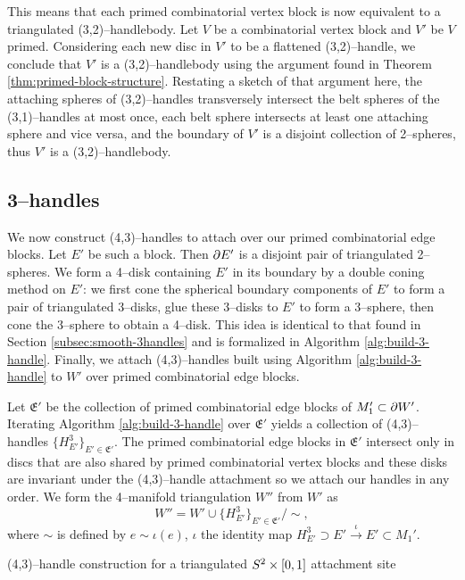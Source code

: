 This means that each primed combinatorial vertex block is now equivalent to a triangulated (3,2)--handlebody.
Let $V$ be a combinatorial vertex block and $V'$ be $V$ primed.
Considering each new disc in $V'$ to be a flattened (3,2)--handle, we conclude that $V'$ is a (3,2)--handlebody using the argument found in Theorem \ref{thm:primed-block-structure}.
Restating a sketch of that argument here, the attaching spheres of (3,2)--handles transversely intersect the belt spheres of the (3,1)--handles at most once, each belt sphere intersects at least one attaching sphere and vice versa, and the boundary of $V'$ is a disjoint collection of 2--spheres, thus $V'$ is a (3,2)--handlebody.

\subsection{3--handles}

We now construct (4,3)--handles to attach over our primed combinatorial edge blocks.
Let $E'$ be such a block.
Then $\partial E'$ is a disjoint pair of triangulated 2--spheres.
We form a 4--disk containing $E'$ in its boundary by a double coning method on $E'$: we first cone the spherical boundary components of $E'$ to form a pair of triangulated 3--disks, glue these 3--disks to $E'$ to form a 3--sphere, then cone the 3--sphere to obtain a 4--disk.
This idea is identical to that found in Section \ref{subsec:smooth-3handles} and is formalized in Algorithm \ref{alg:build-3-handle}.
Finally, we attach (4,3)--handles built using Algorithm \ref{alg:build-3-handle} to $W'$ over primed combinatorial edge blocks.

Let $\mathfrak{E}'$ be the collection of primed combinatorial edge blocks of $M_1'\subset \partial W'$.
Iterating Algorithm \ref{alg:build-3-handle} over $\mathfrak{E}'$ yields a collection of (4,3)--handles $\{H_{E'}^3\}_{E'\in\mathfrak{E}'}$.
The primed combinatorial edge blocks in $\mathfrak{E}'$ intersect only in discs that are also shared by primed combinatorial vertex blocks and these disks are invariant under the (4,3)--handle attachment so we attach our handles in any order.
We form the 4--manifold triangulation $W''$ from $W'$ as
\[
W'' = W'\cup\{H_{E'}^3\}_{E'\in\mathfrak{E}'}/\sim,
\]
where $\sim$ is defined by $e\sim \iota(e)$, $\iota$ the identity map $H_{E'}^3\supset E'\overset{\iota}{\to} E'\subset M_1'$.

\begin{algorithm}[h!]
	\caption{(4,3)--handle construction for a triangulated $S^2\times[0,1]$ attachment site}
	\label{alg:build-3-handle}
\end{algorithm}

